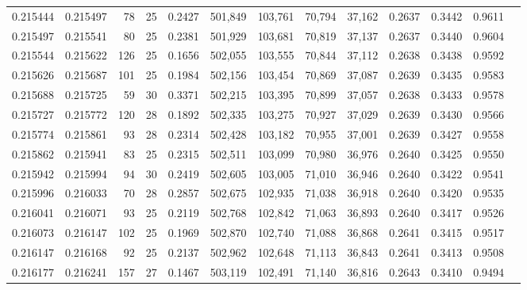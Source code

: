 \begin{tabular}{rrrrrrrrrrrrr}
0.215444 & 0.215497 &  78 &  25 &                                     0.2427 & 501,849 & 103,761 &  70,794 &  37,162 & 0.2637 & 0.3442 & 0.9611 \\
0.215497 & 0.215541 &  80 &  25 &                                     0.2381 & 501,929 & 103,681 &  70,819 &  37,137 & 0.2637 & 0.3440 & 0.9604 \\
0.215544 & 0.215622 & 126 &  25 &                                     0.1656 & 502,055 & 103,555 &  70,844 &  37,112 & 0.2638 & 0.3438 & 0.9592 \\
0.215626 & 0.215687 & 101 &  25 &                                     0.1984 & 502,156 & 103,454 &  70,869 &  37,087 & 0.2639 & 0.3435 & 0.9583 \\
0.215688 & 0.215725 &  59 &  30 &                                     0.3371 & 502,215 & 103,395 &  70,899 &  37,057 & 0.2638 & 0.3433 & 0.9578 \\
0.215727 & 0.215772 & 120 &  28 &                                     0.1892 & 502,335 & 103,275 &  70,927 &  37,029 & 0.2639 & 0.3430 & 0.9566 \\
0.215774 & 0.215861 &  93 &  28 &                                     0.2314 & 502,428 & 103,182 &  70,955 &  37,001 & 0.2639 & 0.3427 & 0.9558 \\
0.215862 & 0.215941 &  83 &  25 &                                     0.2315 & 502,511 & 103,099 &  70,980 &  36,976 & 0.2640 & 0.3425 & 0.9550 \\
0.215942 & 0.215994 &  94 &  30 &                                     0.2419 & 502,605 & 103,005 &  71,010 &  36,946 & 0.2640 & 0.3422 & 0.9541 \\
0.215996 & 0.216033 &  70 &  28 &                                     0.2857 & 502,675 & 102,935 &  71,038 &  36,918 & 0.2640 & 0.3420 & 0.9535 \\
0.216041 & 0.216071 &  93 &  25 &                                     0.2119 & 502,768 & 102,842 &  71,063 &  36,893 & 0.2640 & 0.3417 & 0.9526 \\
0.216073 & 0.216147 & 102 &  25 &                                     0.1969 & 502,870 & 102,740 &  71,088 &  36,868 & 0.2641 & 0.3415 & 0.9517 \\
0.216147 & 0.216168 &  92 &  25 &                                     0.2137 & 502,962 & 102,648 &  71,113 &  36,843 & 0.2641 & 0.3413 & 0.9508 \\
0.216177 & 0.216241 & 157 &  27 &                                     0.1467 & 503,119 & 102,491 &  71,140 &  36,816 & 0.2643 & 0.3410 & 0.9494 \\

\end{tabular}
